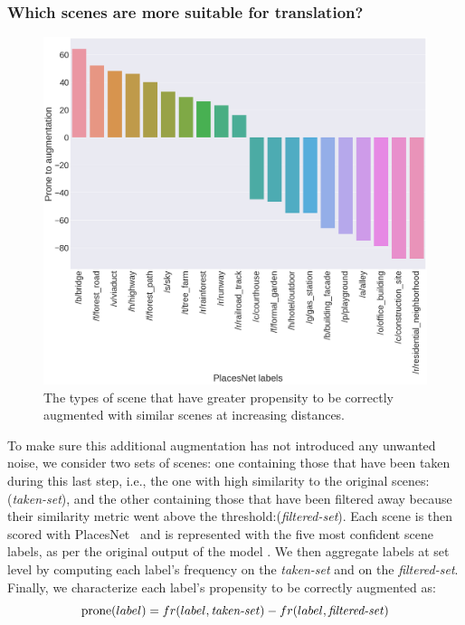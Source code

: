 \subsubsection{Which scenes are more suitable for translation?}
\begin{figure}[t!]
    \centering
    \includegraphics[width=\columnwidth]{SimilarityPlacesPrevalence.png}
    \caption{The types of scene that have greater propensity to be correctly augmented with similar scenes at increasing distances.}
    \label{fig:augmentationSimilarity}
\end{figure}
To make sure this additional augmentation has not introduced any unwanted noise, we consider  two sets of scenes: one containing those that have been taken during this last step, i.e., the one with high similarity to the original scenes:(\emph{taken-set}), and the other containing those that have been filtered away because their similarity metric went above the threshold:(\emph{filtered-set}). Each scene is then scored with PlacesNet~\cite{zhou2014learning} and is represented with the five most confident scene labels, as per the original output of the model . We then aggregate labels at set level by computing each label's frequency on the \emph{taken-set} 
and on the \emph{filtered-set}. Finally, we characterize each label's propensity to be correctly augmented as:
\begin{equation}
    \textrm{prone}(label)= fr(label,\textrm{\emph{taken-set}}) - fr(label,\textrm{\emph{filtered-set}})
\end{equation} 
